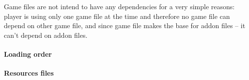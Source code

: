 Game files are not intend to have any dependencies for a very simple reasons: player is using only one game file at the time and therefore no game file can depend on other game file, and since game file makes the base for addon files -- it can't depend on addon files.

\paragraph{Loading order}

\paragraph{Resources files}

